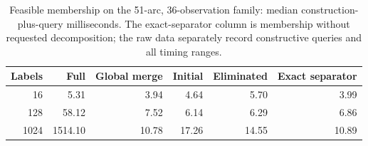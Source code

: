 \begin{table}[tb]\centering\small
\caption{Feasible membership on the 51-arc, 36-observation family: median construction-plus-query milliseconds. The exact-separator column is membership without requested decomposition; the raw data separately record constructive queries and all timing ranges.}
\label{tab:computation-member}
\begin{tabular}{rrrrrr}\toprule
Labels & Full & Global merge & Initial & Eliminated & Exact separator\\\midrule
16 & 5.31 & 3.94 & 4.64 & 5.70 & 3.99 \\
128 & 58.12 & 7.52 & 6.14 & 6.29 & 6.86 \\
1024 & 1514.10 & 10.78 & 17.26 & 14.55 & 10.89 \\
\bottomrule\end{tabular}\end{table}

